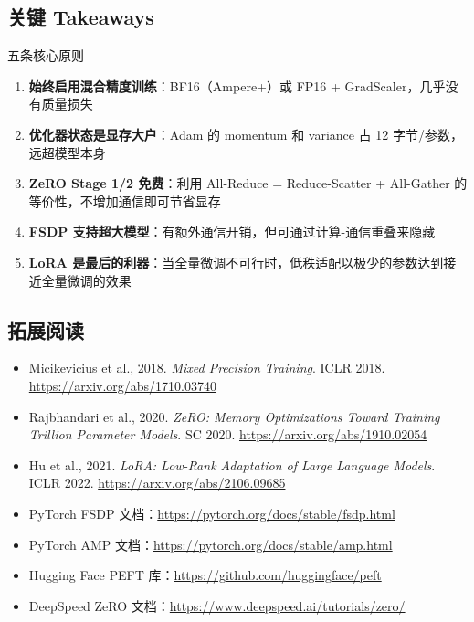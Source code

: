 \documentclass[a4paper]{article}
\begin{document}
\subsection{关键 Takeaways}

\begin{importantbox}{五条核心原则}
\begin{enumerate}
    \item \textbf{始终启用混合精度训练}：BF16（Ampere+）或 FP16 + GradScaler，几乎没有质量损失
    \item \textbf{优化器状态是显存大户}：Adam 的 momentum 和 variance 占 12 字节/参数，远超模型本身
    \item \textbf{ZeRO Stage 1/2 免费}：利用 All-Reduce = Reduce-Scatter + All-Gather 的等价性，不增加通信即可节省显存
    \item \textbf{FSDP 支持超大模型}：有额外通信开销，但可通过计算-通信重叠来隐藏
    \item \textbf{LoRA 是最后的利器}：当全量微调不可行时，低秩适配以极少的参数达到接近全量微调的效果
\end{enumerate}
\end{importantbox}

\subsection{拓展阅读}

\begin{itemize}
    \item Micikevicius et al., 2018. \textit{Mixed Precision Training}. ICLR 2018. \url{https://arxiv.org/abs/1710.03740}
    \item Rajbhandari et al., 2020. \textit{ZeRO: Memory Optimizations Toward Training Trillion Parameter Models}. SC 2020. \url{https://arxiv.org/abs/1910.02054}
    \item Hu et al., 2021. \textit{LoRA: Low-Rank Adaptation of Large Language Models}. ICLR 2022. \url{https://arxiv.org/abs/2106.09685}
    \item PyTorch FSDP 文档：\url{https://pytorch.org/docs/stable/fsdp.html}
    \item PyTorch AMP 文档：\url{https://pytorch.org/docs/stable/amp.html}
    \item Hugging Face PEFT 库：\url{https://github.com/huggingface/peft}
    \item DeepSpeed ZeRO 文档：\url{https://www.deepspeed.ai/tutorials/zero/}
\end{itemize}
\end{document}

